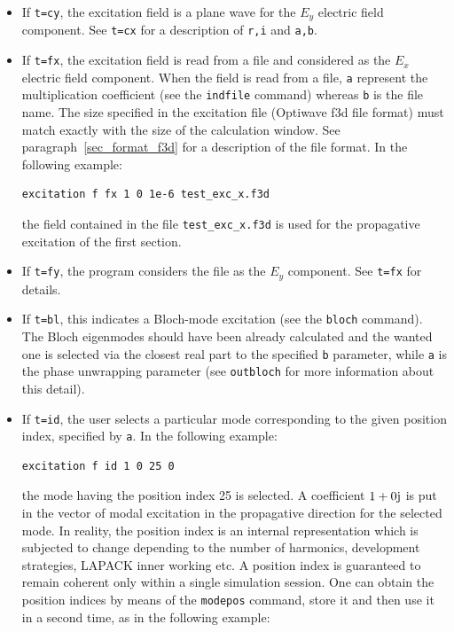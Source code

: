 \begin{itemize}
\item[--] If \lstinline!t=cy!, the excitation field is a plane wave for the
            $E_y$ electric field component. See \lstinline!t=cx! for a description of \lstinline!r,i! and \lstinline!a,b!.
\item[--] If \lstinline!t=fx!, the excitation field is read from a file and
            considered as the $E_x$ electric field component. When the field is read from a file,
            \lstinline!a! represent the multiplication coefficient (see the 
            \lstinline!indfile! command) whereas \lstinline!b! is the file name. The size specified in the excitation file (Optiwave f3d file format) must match exactly with the size of the calculation window. See paragraph~\ref{sec_format_f3d} for a description of the file format.
In the following example:
\begin{lstlisting}
excitation f fx 1 0 1e-6 test_exc_x.f3d
\end{lstlisting}
the field contained in the file \lstinline!test_exc_x.f3d! is used for the propagative excitation of the first section.
            
\item[--] If \lstinline!t=fy!, the program considers the file as the 
            $E_y$ component. See \lstinline!t=fx! for details.
\item[--] If \lstinline!t=bl!, this indicates a Bloch-mode excitation (see 
            the \lstinline!bloch! command).
            The Bloch eigenmodes should have been already calculated and the
            wanted one is selected via the closest real part to the specified
            \lstinline!b! parameter, while \lstinline!a! is the phase unwrapping 
            parameter (see \lstinline!outbloch! for more information about this detail).
            
\item[--] If \lstinline!t=id!, the user selects a particular mode corresponding to the given position index, specified by \lstinline!a!. In the following example:
\begin{lstlisting}
excitation f id 1 0 25 0
\end{lstlisting}
the mode having the position index 25 is selected. A coefficient $1+0\mathrm{j}$ is put in the vector of modal excitation in the propagative direction for the selected mode. In reality, the position index is an internal representation which is subjected to change depending to the number of harmonics, development strategies, LAPACK inner working etc. A position index is guaranteed to remain coherent only within a single simulation session. One can obtain the position indices by means of the \lstinline!modepos! command, store it and then use it in a second time, as in the following example:


\end{itemize}
